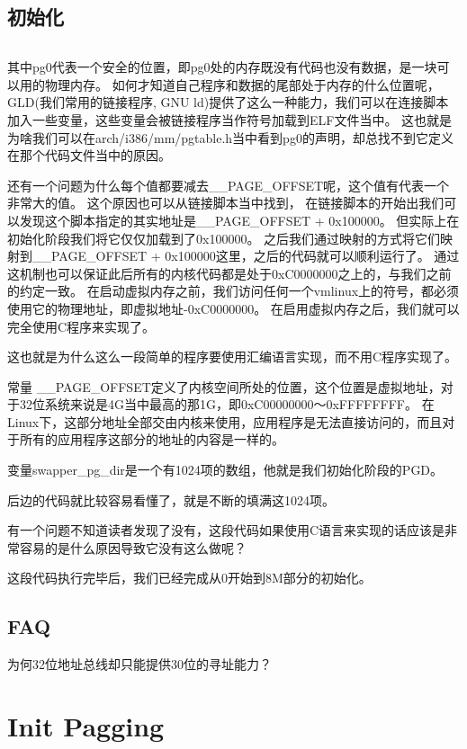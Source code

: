 \subsection{初始化}

\begin{lstlisting}
\end{lstlisting}

其中pg0代表一个安全的位置，即pg0处的内存既没有代码也没有数据，是一块可以用的物理内存。
如何才知道自己程序和数据的尾部处于内存的什么位置呢， GLD(我们常用的链接程序, GNU ld)提供了这么一种能力，我们可以在连接脚本加入一些变量，这些变量会被链接程序当作符号加载到ELF文件当中。
这也就是为啥我们可以在arch/i386/mm/pgtable.h当中看到pg0的声明，却总找不到它定义在那个代码文件当中的原因。

还有一个问题为什么每个值都要减去\_\_PAGE\_OFFSET呢，这个值有代表一个非常大的值。
这个原因也可以从链接脚本当中找到， 在链接脚本的开始出我们可以发现这个脚本指定的其实地址是\_\_PAGE\_OFFSET + 0x100000。
但实际上在初始化阶段我们将它仅仅加载到了0x100000。
之后我们通过映射的方式将它们映射到\_\_PAGE\_OFFSET + 0x100000这里，之后的代码就可以顺利运行了。
通过这机制也可以保证此后所有的内核代码都是处于0xC0000000之上的，与我们之前的约定一致。
在启动虚拟内存之前，我们访问任何一个vmlinux上的符号，都必须使用它的物理地址，即虚拟地址-0xC0000000。
在启用虚拟内存之后，我们就可以完全使用C程序来实现了。

这也就是为什么这么一段简单的程序要使用汇编语言实现，而不用C程序实现了。

常量 \_\_PAGE\_OFFSET定义了内核空间所处的位置，这个位置是虚拟地址，对于32位系统来说是4G当中最高的那1G，即0xC00000000～0xFFFFFFFF。
在Linux下，这部分地址全部交由内核来使用，应用程序是无法直接访问的，而且对于所有的应用程序这部分的地址的内容是一样的。

变量swapper\_pg\_dir是一个有1024项的数组，他就是我们初始化阶段的PGD。

后边的代码就比较容易看懂了，就是不断的填满这1024项。


有一个问题不知道读者发现了没有，这段代码如果使用C语言来实现的话应该是非常容易的是什么原因导致它没有这么做呢？

这段代码执行完毕后，我们已经完成从0开始到8M部分的初始化。

\subsection{FAQ}
为何32位地址总线却只能提供30位的寻址能力？

\section{Init Pagging}

